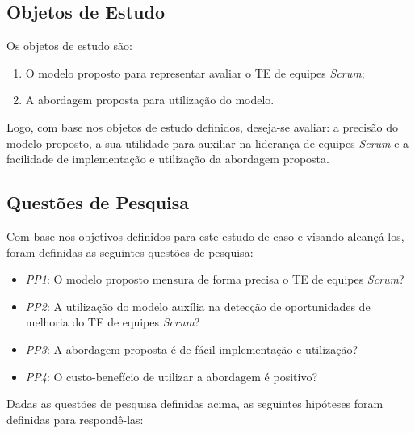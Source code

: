 \subsection{Objetos de Estudo}
\label{estudodecaso:design:objetos}

Os objetos de estudo são:

\begin{enumerate}
  \item O modelo proposto para representar avaliar o TE de equipes \textit{Scrum};
  \item A abordagem proposta para utilização do modelo.
\end{enumerate}

Logo, com base nos objetos de estudo definidos, deseja-se avaliar: a precisão do modelo proposto, a sua utilidade para auxiliar na liderança de equipes \textit{Scrum} e a facilidade de implementação e utilização da abordagem proposta.

\subsection{Questões de Pesquisa}
\label{estudodecaso:design:perguntas}

Com base nos objetivos definidos para este estudo de caso e visando alcançá-los, foram definidas as seguintes questões de pesquisa:

\begin{itemize}
  \item \textit{PP1}: O modelo proposto mensura de forma precisa o TE de equipes \textit{Scrum}?
  \item \textit{PP2}: A utilização do modelo auxília na detecção de oportunidades de melhoria do TE de equipes \textit{Scrum}?
  \item \textit{PP3}: A abordagem proposta é de fácil implementação e utilização?
  \item \textit{PP4}: O custo-benefício de utilizar a abordagem é positivo?
\end{itemize}

Dadas as questões de pesquisa definidas acima, as seguintes hipóteses foram definidas para respondê-las:

